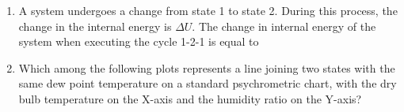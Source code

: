 \documentclass[a4paper,10pt]{article}
\begin{document}
\begin{enumerate}
    \item A system undergoes a change from state 1 to state 2. During this process, the change in the internal energy is $\Delta U$. The change in internal energy of the system when executing the cycle 1-2-1 is equal to
    
    \hfill{}
    \begin{enumerate}
    \end{enumerate}

    \item Which among the following plots represents a line joining two states with the same dew point temperature on a standard psychrometric chart, with the dry bulb temperature on the X-axis and the humidity ratio on the Y-axis?
    

\end{enumerate}
\end{document}
